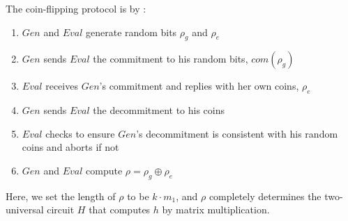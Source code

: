 \documentclass{article}
\begin{document}
\begin{enumerate}
	The coin-flipping protocol is by \cite{?}:
	\begin{enumerate}[label=(\alph*)]
		\item $Gen$ and $Eval$ generate random bits $\rho_{g}$ and $\rho_{e}$
		\item $Gen$ sends $Eval$ the commitment to his random bits, $com(\rho_{g})$
		\item $Eval$ receives $Gen$'s commitment and replies with her own coins, $\rho_{e}$
		\item $Gen$ sends $Eval$ the decommitment to his coins
		\item $Eval$ checks to ensure $Gen$'s decommitment is consistent with his random coins and aborts if not
		\item $Gen$ and $Eval$ compute $\rho = \rho_{g} \oplus \rho_{e}$
	\end{enumerate}
	
	Here, we set the length of $\rho$ to be $k \cdot m_{1}$, and $\rho$ completely determines the two-universal circuit $H$ that computes $h$ by matrix multiplication.
	

\end{enumerate}
\end{document}
